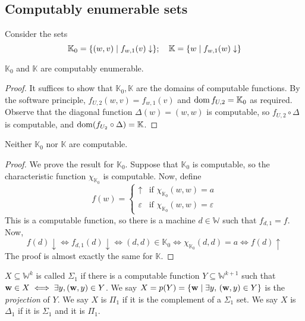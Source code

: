 \subsection{Computably enumerable sets}
Consider the sets
\[ \mathbb K_0 = \qty{(w, v) \mid f_{w,1}(v) \downarrow};\quad \mathbb K = \qty{w \mid f_{w,1}(w) \downarrow} \]
\begin{theorem}
	\( \mathbb K_0 \) and \( \mathbb K \) are computably enumerable.
\end{theorem}
\begin{proof}
	It suffices to show that \( \mathbb K_0, \mathbb K \) are the domains of computable functions.
	By the software principle, \( f_{U,2}(w,v) = f_{w,1}(v) \) and \( \operatorname{dom} f_{U,2} = \mathbb K_0 \) as required.
	Observe that the diagonal function \( \Delta(w) = (w, w) \) is computable, so \( f_{U,2} \circ \Delta \) is computable, and \( \operatorname{dom}(f_{U_2} \circ \Delta) = \mathbb K \).
\end{proof}
\begin{theorem}
	Neither \( \mathbb K_0 \) nor \( \mathbb K \) are computable.
\end{theorem}
\begin{proof}
	We prove the result for \( \mathbb K_0 \).
	Suppose that \( \mathbb K_0 \) is computable, so the characteristic function \( \chi_{\mathbb K_0} \) is computable.
	Now, define
	\[ f(w) = \begin{cases}
		\uparrow & \text{if } \chi_{\mathbb K_0}(w,w) = a \\
		\varepsilon & \text{if } \chi_{\mathbb K_0}(w,w) = \varepsilon
	\end{cases} \]
	This is a computable function, so there is a machine \( d \in \mathbb W \) such that \( f_{d,1} = f \).
	Now,
	\[ f(d) \downarrow \iff f_{d,1}(d) \downarrow \iff (d,d) \in \mathbb K_0 \iff \chi_{\mathbb K_0}(d,d) = a \iff f(d) \uparrow \]
	The proof is almost exactly the same for \( \mathbb K \).
\end{proof}
\begin{definition}
	\( X \subseteq \mathbb W^k \) is called \( \Sigma_1 \) if there is a computable function \( Y \subseteq \mathbb W^{k+1} \) such that \( \vb w \in X \iff \exists y, (\vb w, y) \in Y \).
	We say \( X = p(Y) = \qty{\vb w \mid \exists y,\, (\vb w, y) \in Y} \) is the \emph{projection} of \( Y \).
	We say \( X \) is \( \Pi_1 \) if it is the complement of a \( \Sigma_1 \) set.
	We say \( X \) is \( \Delta_1 \) if it is \( \Sigma_1 \) and it is \( \Pi_1 \).
\end{definition}
